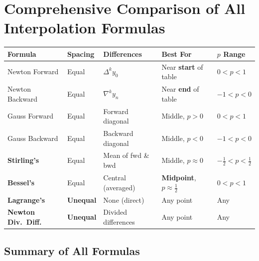 \documentclass[12pt]{article}
\newcommand{\hcell}[1]{\textbf{\color{white}#1}}
\begin{document}
\newpage
\section{Comprehensive Comparison of All Interpolation Formulas}

\begin{center}{\footnotesize\setlength{\tabcolsep}{4pt}
\begin{tabular}{p{3.2cm} C{2cm} C{2.8cm} C{2.8cm} C{2.2cm}}
\toprule
{}
\hcell{Formula} & \hcell{Spacing} & \hcell{Differences} & \hcell{Best For} & \hcell{$p$ Range} \\
\midrule
{}
Newton Forward & Equal & $\Delta^k y_0$ & Near \textbf{start} of table & $0 < p < 1$ \\
Newton Backward & Equal & $\nabla^k y_n$ & Near \textbf{end} of table & $-1 < p < 0$ \\
Gauss Forward & Equal & Forward diagonal & Middle, $p > 0$ & $0 < p < 1$ \\
Gauss Backward & Equal & Backward diagonal & Middle, $p < 0$ & $-1 < p < 0$ \\
\textbf{Stirling's} & Equal & Mean of fwd \& bwd & Middle, $p \approx 0$ & $-\tfrac{1}{2} < p < \tfrac{1}{2}$ \\
\textbf{Bessel's} & Equal & Central (averaged) & \textbf{Midpoint}, $p \approx \tfrac{1}{2}$ & $0 < p < 1$ \\
\textbf{Lagrange's} & \textbf{Unequal} & None (direct) & Any point & Any \\
\textbf{Newton Div.\ Diff.} & \textbf{Unequal} & Divided differences & Any point & Any \\
\bottomrule
\end{tabular}
}\end{center}

\bigskip

\subsection*{Summary of All Formulas}
\end{document}
